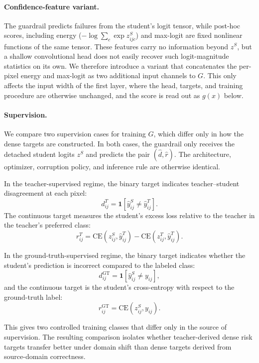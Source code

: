 \documentclass{article}
\begin{document}
\paragraph{Confidence-feature variant.}
\label{sec:conffeat-method}
The guardrail predicts failures from the student's logit tensor, while post-hoc scores, including energy ($-\log\sum_c \exp z^S_{ijc}$) and max-logit are fixed nonlinear functions of the same tensor. These features carry no information beyond $z^S$, but a shallow convolutional head does not easily recover such logit-magnitude statistics on its own. We therefore introduce a variant that concatenates the per-pixel energy and max-logit as two additional input channels to $G$. This only affects the input width of the first layer, where the head, targets, and training procedure are otherwise unchanged, and the score is read out as $g(x)$ below.


\paragraph{Supervision.}
We compare two supervision cases for training $G$, which differ only in how the dense targets are constructed. In both cases, the guardrail only receives the detached student logits $z^S$ and predicts the pair $(\hat d, \hat r)$. The architecture, optimizer, corruption policy, and inference rule are otherwise identical.


In the teacher-supervised regime, the binary target indicates teacher--student disagreement at each pixel:
\[
d^{T}_{ij} = \mathbf{1}\!\left[\hat y^S_{ij} \neq \hat y^T_{ij}\right].
\]
The continuous target measures the student's excess loss relative to the teacher in the teacher's preferred class:
\[
r^{T}_{ij}
=
\mathrm{CE}\!\left(z^S_{ij}, \hat y^T_{ij}\right)
-
\mathrm{CE}\!\left(z^T_{ij}, \hat y^T_{ij}\right).
\]


In the ground-truth-supervised regime, the binary target indicates whether the student's prediction is incorrect compared to the labeled class:
\[
d^{\mathrm{GT}}_{ij} = \mathbf{1}\!\left[\hat y^S_{ij} \neq y_{ij}\right],
\]
and the continuous target is the student's cross-entropy with respect to the ground-truth label:
\[
r^{\mathrm{GT}}_{ij}
=
\mathrm{CE}\!\left(z^S_{ij}, y_{ij}\right).
\]


This gives two controlled training classes that differ only in the source of supervision. The resulting comparison isolates whether teacher-derived dense risk targets transfer better under domain shift than dense targets derived from source-domain correctness.
\end{document}
